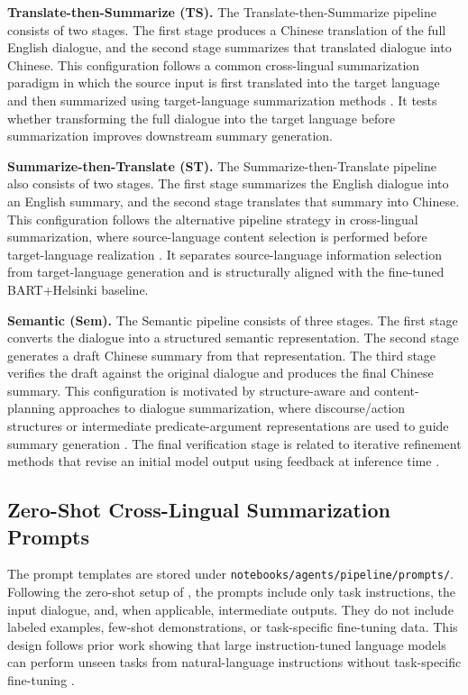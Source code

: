 \documentclass[11pt]{article}
\begin{document}
\medskip
\noindent\textbf{Translate-then-Summarize (TS).}
The Translate-then-Summarize pipeline consists of two stages. The first stage
produces a Chinese translation of the full English dialogue, and the second
stage summarizes that translated dialogue into Chinese. This configuration
follows a common cross-lingual summarization paradigm in which the source input
is first translated into the target language and then summarized using
target-language summarization methods \citep{wang-etal-2022-survey-cls,ouyang-etal-2019-robust}.
It tests whether transforming the full dialogue into the target language before
summarization improves downstream summary generation.

\medskip
\noindent\textbf{Summarize-then-Translate (ST).}
The Summarize-then-Translate pipeline also consists of two stages. The first
stage summarizes the English dialogue into an English summary, and the second
stage translates that summary into Chinese. This configuration follows the
alternative pipeline strategy in cross-lingual summarization, where
source-language content selection is performed before target-language
realization \citep{wan-etal-2010-cross,parnell-etal-2024-sumtra}. It separates
source-language information selection from target-language generation and is
structurally aligned with the fine-tuned BART+Helsinki baseline.

\medskip
\noindent\textbf{Semantic (Sem).}
The Semantic pipeline consists of three stages. The first stage converts the
dialogue into a structured semantic representation. The second stage generates a
draft Chinese summary from that representation. The third stage verifies the
draft against the original dialogue and produces the final Chinese summary. This
configuration is motivated by structure-aware and content-planning approaches to
dialogue summarization, where discourse/action structures or intermediate
predicate-argument representations are used to guide summary generation
\citep{chen-yang-2021-structure,wang-etal-2022-guiding}. The final verification
stage is related to iterative refinement methods that revise an initial model
output using feedback at inference time \citep{madaan-etal-2023-self-refine}.

\subsection{Zero-Shot Cross-Lingual Summarization Prompts}

The prompt templates are stored under
\texttt{notebooks/agents/pipeline/prompts/}. Following the zero-shot setup of
\citet{wang-etal-2023-zero-shot-cls}, the prompts include only task instructions,
the input dialogue, and, when applicable, intermediate outputs. They do not
include labeled examples, few-shot demonstrations, or task-specific fine-tuning
data. This design follows prior work showing that large instruction-tuned
language models can perform unseen tasks from natural-language instructions
without task-specific fine-tuning \citep{brown-etal-2020-language,wei-etal-2022-finetuned}.
\end{document}
